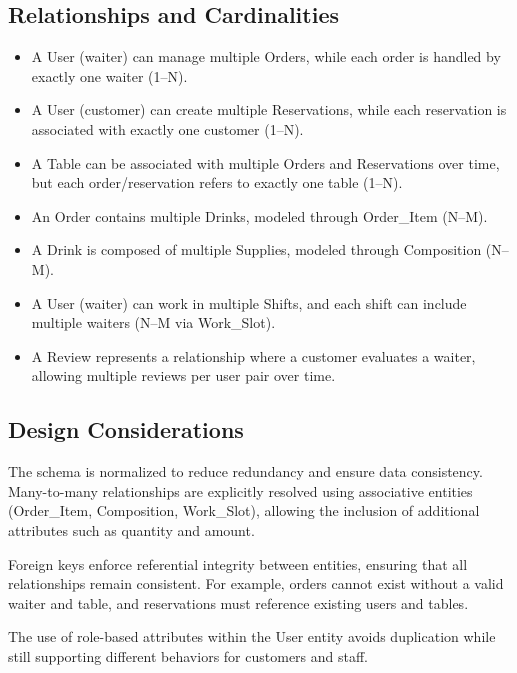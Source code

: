 \documentclass[a4paper]{article}
\begin{document}
\subsection{Relationships and Cardinalities}


\begin{itemize}
\item
  A User (waiter) can manage multiple Orders, while each order is
  handled by exactly one waiter (1--N).
\item
  A User (customer) can create multiple Reservations, while each
  reservation is associated with exactly one customer (1--N).
\item
  A Table can be associated with multiple Orders and Reservations over
  time, but each order/reservation refers to exactly one table (1--N).
\item
  An Order contains multiple Drinks, modeled through Order\_Item (N--M).
\item
  A Drink is composed of multiple Supplies, modeled through Composition
  (N--M).
\item
  A User (waiter) can work in multiple Shifts, and each shift can
  include multiple waiters (N--M via Work\_Slot).
\item
  A Review represents a relationship where a customer evaluates a
  waiter, allowing multiple reviews per user pair over time.
\end{itemize}





\subsection{Design Considerations}

The schema is normalized to reduce redundancy and ensure data
consistency.\\
Many-to-many relationships are explicitly resolved using associative
entities (Order\_Item, Composition, Work\_Slot), allowing the inclusion
of additional attributes such as quantity and amount.

Foreign keys enforce referential integrity between entities, ensuring
that all relationships remain consistent. For example, orders cannot
exist without a valid waiter and table, and reservations must reference
existing users and tables.

The use of role-based attributes within the User entity avoids
duplication while still supporting different behaviors for customers and
staff.
\end{document}
